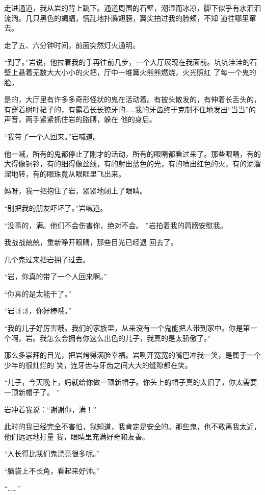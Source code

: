 \documentclass{article}
\begin{document}
走进通道，我从岩的背上跳下。通道周围的石壁，潮湿而冰凉，脚下似乎有水汩汩流淌。几只黑色的蝙蝠，慌乱地扑腾翅膀，翼尖拍过我的脸颊，不知
道往哪里窜去。 

\newpage


走了五、六分钟时间，前面突然灯火通明。 

“到了。”岩说，他拉着我的手再往前几步，一个大厅展现在我面前。坑坑洼洼的石壁上悬着无数大大小小的火把，厅中一堆篝火熊熊燃烧，火光照红
了每一个鬼的脸。 

是的，大厅里有许多多奇形怪状的鬼在活动着。有披头散发的，有伸着长舌头的，有穿着树叶裙子的，有露着长长獠牙的……我的牙齿终于克制不住地发出“当当”的声音，两手紧紧抓住岩的胳膊，躲在
他的身后。 


“我带了一个人回来。”岩喊道。 

他一喊，所有的鬼都停止了刚才的活动，所有的眼睛都看过来了。那些眼睛，有的大得像铜铃，有的细得像丝线，有的射出蓝色的光，有的喷出红色的火，有的滴溜溜地转，有的眼珠竟从眼眶里飞出来。

妈呀，我一把抱住了岩，紧紧地闭上了眼睛。
\newpage



“别把我的朋友吓坏了。”岩喊道。 

“没事的，满。他们不会伤害你，绝对不会。
”岩拍着我的肩膀安慰我。 

我战战兢兢，重新睁开眼睛，那些目光已经退
回去了。 


几个鬼过来把岩拥了过去。 


“岩，你真的带了一个人回来啊。” 


“你真的是太能干了。” 


“岩哥哥，你好棒哦。” 

“我的儿子好厉害哦。我们的家族里，从来没有一个鬼能把人带到家中。你是第一个啊，岩。我怎么会拥有你这么出色的儿子，我真的是太骄傲了。”

\newpage

那么多崇拜的目光，把岩烤得满脸幸福。岩咧开宽宽的嘴巴冲我一笑，是属于一个少年的很灿烂的
笑，连牙齿与牙齿之间大大的缝隙都在笑。 

“儿子，今天晚上，妈就给你做一顶新帽子。你头上的帽子真的太旧了，你太需要一顶新帽子了。
” 


岩冲着我说：“谢谢你，满！” 

此时的我已经完全不害怕，我知道，我肯定是安全的。那些鬼，也不敢离我太近，他们远远地打量
我，眼睛里充满好奇和友善。 


“人长得比我们鬼漂亮很多呢。” 


“脑袋上不长角，看起来好帅。” 


“……” 
\end{document}
